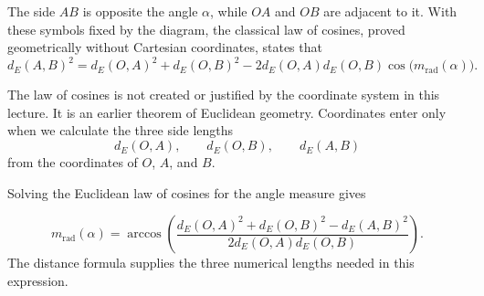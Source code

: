 \begin{center}
\end{center}

The side $AB$ is opposite the angle $\alpha$, while $OA$ and $OB$ are adjacent
to it. With these symbols fixed by the diagram, the classical law of cosines,
proved geometrically without Cartesian coordinates, states that
\[
d_E(A,B)^2
=
d_E(O,A)^2+d_E(O,B)^2
-2d_E(O,A)d_E(O,B)
\cos\bigl(m_{\mathrm{rad}}(\alpha)\bigr).
\]

\begin{remarkbox}
The law of cosines is not created or justified by the coordinate system in this
lecture. It is an earlier theorem of Euclidean geometry. Coordinates enter only
when we calculate the three side lengths
\[
d_E(O,A),\qquad d_E(O,B),\qquad d_E(A,B)
\]
from the coordinates of $O$, $A$, and $B$.
\end{remarkbox}

Solving the Euclidean law of cosines for the angle measure gives
\begin{theorembox}
\[
\boxed{
m_{\mathrm{rad}}(\alpha)
=
\arccos\left(
\frac{
d_E(O,A)^2+d_E(O,B)^2-d_E(A,B)^2
}{
2d_E(O,A)d_E(O,B)
}
\right)
}.
\]
The distance formula supplies the three numerical lengths needed in this
expression.
\end{theorembox}

